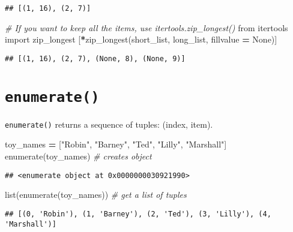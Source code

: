 \documentclass[
]{book}
\newenvironment{Shaded}{\begin{snugshade}}{\end{snugshade}}
\newcommand{\BuiltInTok}[1]{#1}
\newcommand{\CommentTok}[1]{\textcolor[rgb]{0.56,0.35,0.01}{\textit{#1}}}
\newcommand{\ImportTok}[1]{#1}
\newcommand{\NormalTok}[1]{#1}
\newcommand{\OperatorTok}[1]{\textcolor[rgb]{0.81,0.36,0.00}{\textbf{#1}}}
\newcommand{\StringTok}[1]{\textcolor[rgb]{0.31,0.60,0.02}{#1}}
\newcommand{\VariableTok}[1]{\textcolor[rgb]{0.00,0.00,0.00}{#1}}
\begin{document}
\begin{verbatim}
## [(1, 16), (2, 7)]
\end{verbatim}

\begin{Shaded}
\begin{Highlighting}[]
\CommentTok{\# If you want to keep all the items, use itertools.zip\_longest()}
\ImportTok{from}\NormalTok{ itertools }\ImportTok{import}\NormalTok{ zip\_longest}
\NormalTok{[}\OperatorTok{*}\NormalTok{zip\_longest(short\_list, long\_list, fillvalue }\OperatorTok{=} \VariableTok{None}\NormalTok{)]}
\end{Highlighting}
\end{Shaded}

\begin{verbatim}
## [(1, 16), (2, 7), (None, 8), (None, 9)]
\end{verbatim}

\hypertarget{enumerate}{%
\section{\texorpdfstring{\texttt{enumerate()}}{enumerate()}}\label{enumerate}}

\texttt{enumerate()} returns a sequence of tuples: (index, item).

\begin{Shaded}
\begin{Highlighting}[]
\NormalTok{toy\_names }\OperatorTok{=}\NormalTok{ [}\StringTok{"Robin"}\NormalTok{, }\StringTok{"Barney"}\NormalTok{, }\StringTok{"Ted"}\NormalTok{, }\StringTok{"Lilly"}\NormalTok{, }\StringTok{"Marshall"}\NormalTok{]}
\BuiltInTok{enumerate}\NormalTok{(toy\_names) }\CommentTok{\# creates object}
\end{Highlighting}
\end{Shaded}

\begin{verbatim}
## <enumerate object at 0x0000000030921990>
\end{verbatim}

\begin{Shaded}
\begin{Highlighting}[]
\BuiltInTok{list}\NormalTok{(}\BuiltInTok{enumerate}\NormalTok{(toy\_names)) }\CommentTok{\# get a list of tuples}
\end{Highlighting}
\end{Shaded}

\begin{verbatim}
## [(0, 'Robin'), (1, 'Barney'), (2, 'Ted'), (3, 'Lilly'), (4, 'Marshall')]
\end{verbatim}
\end{document}
